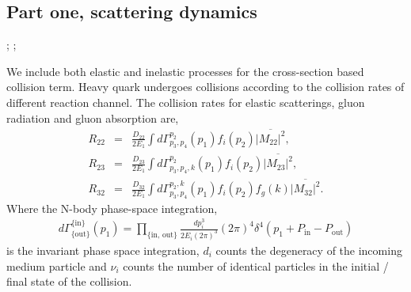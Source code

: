 \documentclass[aps, prc, reprint, amsmath, groupedaddress, nofootinbib]{revtex4-1}
\begin{document}
\subsection{Part one, scattering dynamics}    
\begin{center}
;
;
\end{center}
We include both elastic and inelastic processes for the cross-section based collision term.
Heavy quark undergoes collisions according to the collision rates of different reaction channel.
The collision rates for elastic scatterings, gluon radiation and gluon absorption are,
\begin{eqnarray}
    R_{22} &=& \frac{D_{22}}{2E_1} \int d \Gamma_{p_3,p_4}^{p_2}(p_1) f_i(p_2)  \overline{|M_{22}|^2},
   \nonumber
  \\
  R_{23} &=& \frac{D_{23}}{2E_1} \int d \Gamma_{p_3,p_4,k}^{p_2}(p_1) f_i(p_2) 
\overline{|M_{23}|^2},
  	 \nonumber
  \\
  R_{32} &=& \frac{D_{32}}{2E_1} \int d \Gamma_{p_3,p_4}^{p_2,k}(p_1) f_i(p_2)f_g(k)
\overline{|M_{32}|^2}.
  	 \nonumber
\end{eqnarray}
Where the N-body phase-space integration,
\begin{eqnarray}
\nonumber
d\Gamma_{\{\textrm{out}\}}^{\{\textrm{in}\}}(p_1) = \prod_{\{\textrm{in, out}\}} \frac{dp_i^3}{2E_i(2\pi)^3} (2\pi)^4\delta^4(p_1+P_{\text{in}} - P_{\textrm{out}})
\end{eqnarray}
 is the invariant phase space integration, $d_i$ counts the degeneracy of the incoming medium particle and $\nu_i$ counts the number of identical particles in the initial / final state of the collision.
\end{document}
